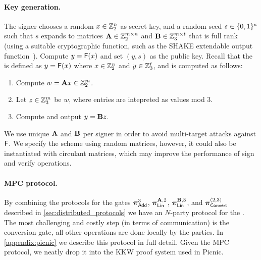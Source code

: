 \paragraph{Key generation.}
The signer chooses a random $x \in \mathbb{Z}_2^n$ as 
secret key, and a random seed $s \in \{0,1\}^{\kappa}$ such that $s$
expands to matrices $\mathbf{A} \in \mathbb{Z}_2^{m\times n}$ and $\mathbf{B}\in \mathbb{Z}_3^{m\times t}$ that is full rank (using a suitable cryptographic
function, such as the SHAKE extendable output function~\cite{sp800-185}).
Compute $y = \mathsf{F}(x)$ and set $(y, s)$ as the public key.
Recall that the \ttOWF is defined as $y = \mathsf{F}(x)$ where $x \in \mathbb{Z}_2^{n}$ and $y\in \mathbb{Z}_3^{t}$, and is computed as follows: 
\begin{enumerate}
\item Compute $w = \mathbf{A} x \in \mathbb{Z}_2^{m}$.
\item Let $z\in\mathbb{Z}_3^{m}$ be $w$, where entries are intepreted as values mod 3.
\item Compute and output $y = \mathbf{B} z$.
\end{enumerate}
We use unique $\mathbf{A}$ and $\mathbf{B}$ per signer in order to avoid multi-target attacks against $\mathsf{F}$.
We specify the scheme using random matrices, however, it could also be instantiated
with circulant matrices, which may improve the performance of sign and verify operations.

\paragraph{MPC protocol.}
By combining the protocols for the gates 
$\boldsymbol{\pi}_{\textnormal{\textsf{Add}}}^{3}$,
$\prot_{\LMap}^{\mat{A},2}$,
$\prot_{\LMap}^{\mat{B},3}$, and
$\boldsymbol{\pi}_{\textnormal{\textsf{Convert}}}^{(2,3)}$
described in \cref{sec:distributed_protocols} we have an $N$-party protocol for
the \ttOWF. The most challenging and costly step (in terms of communication) is
the conversion gate, all other operations are done locally by the parties.  In
\cref{appendix:picnic} we describe this protocol in full detail.  Given the MPC
protocol, we neatly drop it into the KKW proof system used in Picnic.  

